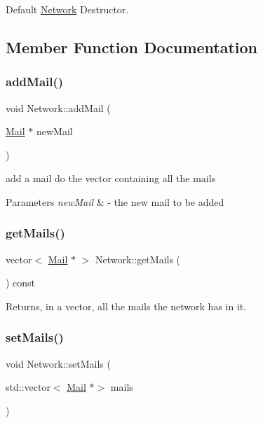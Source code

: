 Default \mbox{\hyperlink{classNetwork}{Network}} Destructor. 



\subsection{Member Function Documentation}
\mbox{\label{classNetwork_a848afdda14081f142404050833050d4b}} 
\subsubsection{\texorpdfstring{add\+Mail()}{addMail()}}
{\footnotesize\ttfamily void Network\+::add\+Mail (\begin{DoxyParamCaption}\item[{\mbox{\hyperlink{classMail}{Mail}} $\ast$}]{new\+Mail }\end{DoxyParamCaption})}



add a mail do the vector containing all the mails 


\begin{DoxyParams}{Parameters}
{\em new\+Mail} & -\/ the new mail to be added \\
\hline
\end{DoxyParams}
\mbox{\label{classNetwork_acd375ea0a8fb7558f15a432ce6354d93}} 
\subsubsection{\texorpdfstring{get\+Mails()}{getMails()}}
{\footnotesize\ttfamily vector$<$ \mbox{\hyperlink{classMail}{Mail}} $\ast$ $>$ Network\+::get\+Mails (\begin{DoxyParamCaption}{ }\end{DoxyParamCaption}) const}



Returns, in a vector, all the mails the network has in it. 

\mbox{\label{classNetwork_a2dfe751f83ea0ed37835baf23770d1b6}} 
\subsubsection{\texorpdfstring{set\+Mails()}{setMails()}}
{\footnotesize\ttfamily void Network\+::set\+Mails (\begin{DoxyParamCaption}\item[{std\+::vector$<$ \mbox{\hyperlink{classMail}{Mail}} $\ast$$>$}]{mails }\end{DoxyParamCaption})}




